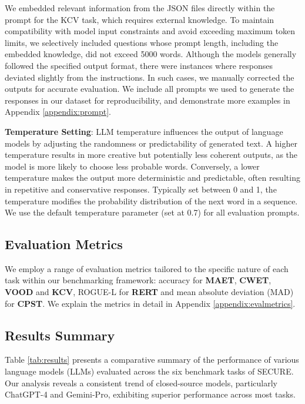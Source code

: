 \documentclass[conference]{IEEEtran}
\begin{document}
We embedded relevant information from the JSON files directly within the prompt for the KCV task, which requires external knowledge. To maintain compatibility with model input constraints and avoid exceeding maximum token limits, we selectively included questions whose prompt length, including the embedded knowledge, did not exceed 5000 words. Although the models generally followed the specified output format, there were instances where responses deviated slightly from the instructions. In such cases, we manually corrected the outputs for accurate evaluation. We include all prompts we used to generate the responses in our dataset for reproducibility, and demonstrate more examples in Appendix \ref{appendix:prompt}.

\textbf{Temperature Setting}: LLM temperature influences the output of language models by adjusting the randomness or predictability of generated text. A higher temperature results in more creative but potentially less coherent outputs, as the model is more likely to choose less probable words. Conversely, a lower temperature makes the output more deterministic and predictable, often resulting in repetitive and conservative responses. Typically set between 0 and 1, the temperature modifies the probability distribution of the next word in a sequence. We use the default temperature parameter (set at 0.7) for all evaluation prompts.


\subsection{Evaluation Metrics}
We employ a range of evaluation metrics tailored to the specific nature of each task within our benchmarking framework: accuracy for \textbf{MAET}, \textbf{CWET}, \textbf{VOOD} and \textbf{KCV}, ROGUE-L \cite{lin-2004-rouge} for \textbf{RERT} and mean absolute deviation (MAD) for \textbf{CPST}. We explain the metrics in detail in Appendix \ref{appendix:evalmetrics}.

\subsection{Results Summary}

Table \ref{tab:results} presents a comparative summary of the performance of various language models (LLMs) evaluated across the six benchmark tasks of SECURE. Our analysis reveals a consistent trend of closed-source models, particularly ChatGPT-4 and Gemini-Pro, exhibiting superior performance across most tasks.
\end{document}
